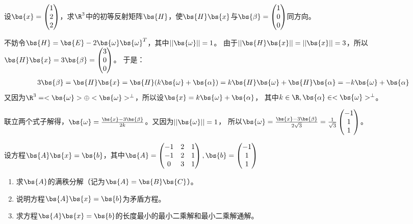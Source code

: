 \documentclass[12pt, a4paper, oneside, UTF8]{ctexbook}
\begin{document}
\begin{question}
    设$\bs{x}=\begin{pmatrix}
        1\\
        2\\
        2
    \end{pmatrix}$，求$\R^3$中的初等反射矩阵$\bs{H}$，使$\bs{H}\bs{x}$与$\bs{\beta}=\begin{pmatrix}
        1\\
        0\\
        0
    \end{pmatrix}$同方向。
\end{question}

\begin{solution}
    不妨令$\bs{H}=\bs{E}-2\bs{\omega}\bs{\omega}^T$，其中$||\bs{\omega}||=1$。
    由于$||\bs{H}\bs{x}||=||\bs{x}||=3$，所以$\bs{H}\bs{x}=3\bs{\beta}=\begin{pmatrix}
        3\\
        0\\
        0
    \end{pmatrix}$。
    于是：
    \begin{align*}
        3\bs{\beta}=\bs{H}\bs{x}=\bs{H}(k\bs{\omega}+\bs{\alpha})=k\bs{H}\bs{\omega}+\bs{H}\bs{\alpha}=-k\bs{\omega}+\bs{\alpha}
    \end{align*}
    又因为$\R^3=<\bs{\omega}> \oplus <\bs{\omega}>^{\perp}$，所以设$\bs{x}=k\bs{\omega}+\bs{\alpha}$，
    其中$k \in \R,\bs{\alpha} \in <\bs{\omega}>^{\perp}$。
   
    联立两个式子解得，$\bs{\omega}=\frac{\bs{x}-3\bs{\beta}}{2k}$。又因为$||\bs{\omega}||=1$，
    所以$\bs{\omega}=\frac{\bs{x}-3\bs{\beta}}{2\sqrt{3}}=\frac{1}{\sqrt{3}}\begin{pmatrix}
        -1 \\
        1\\
        1
    \end{pmatrix}$。

\end{solution}

\begin{question}
    设方程$\bs{A}\bs{x}=\bs{b}$，其中$\bs{A}=\begin{pmatrix}
        -1&2&1\\
        -1&2&1\\
        0&3&1
    \end{pmatrix},\bs{b}=\begin{pmatrix}
        -1\\
        1\\
        1
    \end{pmatrix}$
    \begin{enumerate}[label=(\arabic{*})]
        \item 求$\bs{A}$的满秩分解（记为$\bs{A}=\bs{B}\bs{C}$）。
        \item 说明方程$\bs{A}\bs{x}=\bs{b}$为矛盾方程。
        \item 求方程$\bs{A}\bs{x}=\bs{b}$的长度最小的最小二乘解和最小二乘解通解。
    \end{enumerate}
\end{question}
\end{document}
